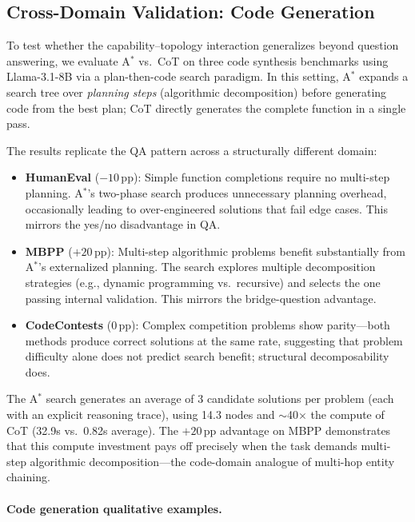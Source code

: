 \documentclass{article}
\newcommand{\astar}{A$^*$\xspace}
\begin{document}
\subsection{Cross-Domain Validation: Code Generation}
\label{sec:code}

To test whether the capability--topology interaction generalizes beyond question answering, we evaluate \astar vs.\ CoT on three code synthesis benchmarks using Llama-3.1-8B via a plan-then-code search paradigm. In this setting, \astar expands a search tree over \emph{planning steps} (algorithmic decomposition) before generating code from the best plan; CoT directly generates the complete function in a single pass.

The results replicate the QA pattern across a structurally different domain:
\begin{itemize}[leftmargin=*, noitemsep]
  \item \textbf{HumanEval} ($-10$\,pp): Simple function completions require no multi-step planning. \astar's two-phase search produces unnecessary planning overhead, occasionally leading to over-engineered solutions that fail edge cases. This mirrors the yes/no disadvantage in QA.
  \item \textbf{MBPP} ($+20$\,pp): Multi-step algorithmic problems benefit substantially from \astar's externalized planning. The search explores multiple decomposition strategies (e.g., dynamic programming vs.\ recursive) and selects the one passing internal validation. This mirrors the bridge-question advantage.
  \item \textbf{CodeContests} (0\,pp): Complex competition problems show parity---both methods produce correct solutions at the same rate, suggesting that problem difficulty alone does not predict search benefit; structural decomposability does.
\end{itemize}

The \astar search generates an average of 3 candidate solutions per problem (each with an explicit reasoning trace), using 14.3 nodes and $\sim$40$\times$ the compute of CoT (32.9s vs.\ 0.82s average). The $+20$\,pp advantage on MBPP demonstrates that this compute investment pays off precisely when the task demands multi-step algorithmic decomposition---the code-domain analogue of multi-hop entity chaining.

\paragraph{Code generation qualitative examples.}
\end{document}
